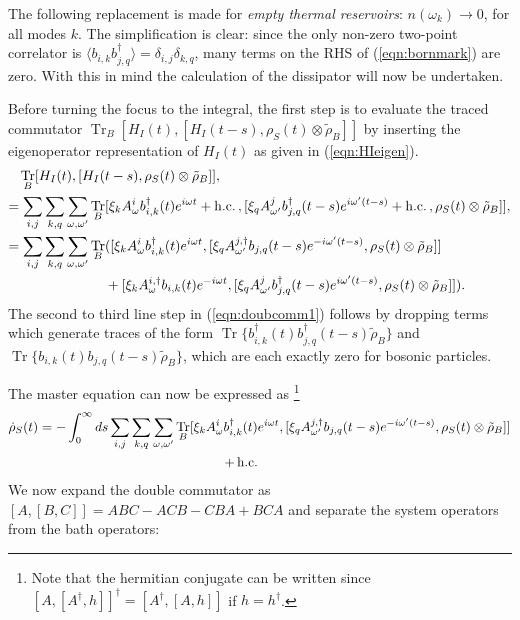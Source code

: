 \documentclass[11pt,a4paper,article,oneside]{memoir}
\DeclareMathOperator{\Hc}{h.c.}  \DeclareMathOperator{\Tr}{Tr}
\begin{document}
The following replacement is made for \textit{empty thermal
  reservoirs}: $n(\omega_{k})\rightarrow 0$, for all modes $k$. The
simplification is clear: since the only non-zero two-point correlator
is $\langle b_{i,k}b^\dagger_{j,q}\rangle =\delta_{i,j}\delta_{k,q}$,
many terms on the RHS of (\ref{eqn:bornmark}) are zero. With this in
mind the calculation of the dissipator will now be undertaken.  \par
Before turning the focus to the integral, the first step is to
evaluate the traced commutator
$\Tr_B[H_I(t),[H_I(t-s),\rho_S(t)\otimes\tilde{\rho}_B]]$ by inserting
the eigenoperator representation of $H_I(t)$ as given in
(\ref{eqn:HIeigen}).
\begin{align}
	\Tr_B[H_I(t),[H_I(&t-s),\rho_S(t)\otimes\tilde{\rho}_B]],\notag \\ 
	=\sum_{i,j}\sum_{k,q}\sum_{\omega,\omega'}\Tr_B&[\xi_k A^i_\omega
        b^\dagger_{i,k}(t)e^{i\omega t}+\Hc\,,[\xi_q A^{j}_{\omega'}
        b^\dagger_{j,q}(t-s)e^{i\omega' (t-s)}+\Hc\,,\rho_S(t)\otimes\tilde{\rho}_B]], \notag \\
	=\sum_{i,j}\sum_{k,q}\sum_{\omega,\omega'}\Tr_B&([\xi_k A^i_\omega
        b^\dagger_{i,k}(t)e^{i\omega t},[\xi_q A^{j,\dagger}_{\omega'}
        b_{j,q}(t-s)e^{-i\omega' (t-s)},\rho_S(t)\otimes\tilde{\rho}_B]]\notag \\
	&+[\xi_k A^{i,\dagger}_\omega
        b_{i,k}(t)e^{-i\omega t},[\xi_q A^{j}_{\omega'}
        b^\dagger_{j,q}(t-s)e^{i\omega' (t-s)},\rho_S(t)\otimes\tilde{\rho}_B]]).
        \label{eqn:doubcomm1}
\end{align}
The second to third line step in (\ref{eqn:doubcomm1}) follows by
dropping terms which generate traces of the form
$\Tr\{b^\dagger_{i,k}(t)b^\dagger_{j,q}(t-s)\tilde{\rho}_B\}$ and
$\Tr\{b_{i,k}(t)b_{j,q}(t-s)\tilde{\rho}_B\}$, which are each exactly
zero for bosonic particles.  \par The master equation can now be
expressed as \footnote{Note that the hermitian conjugate can be
  written since $[A,[A^\dagger,h]]^\dagger=[A^\dagger,[A,h]]$ if
  $h=h^\dagger$.}
\begin{align}
\dot{\rho}_S(t)=-\int^\infty_0ds\sum_{i,j}\sum_{k,q}\sum_{\omega,\omega'}\Tr_B[\xi_k A^i_\omega
        b^\dagger_{i,k}(t)&e^{i\omega t},[\xi_q A^{j,\dagger}_{\omega'}
        b_{j,q}(t-s)e^{-i\omega' (t-s)},\rho_S(t)\otimes\tilde{\rho}_B]] \notag \\
+\Hc
\end{align} 
We now expand the double commutator as $[A,[B,C]]=ABC-ACB-CBA+BCA$ and separate the system operators from the bath operators:
\end{document}
